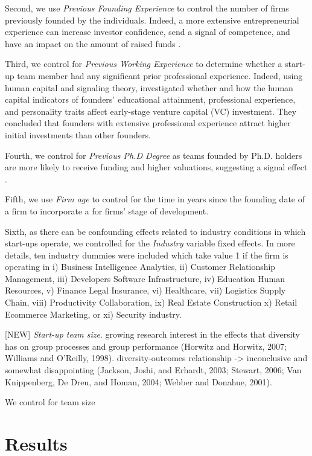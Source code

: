 \documentclass[12pt]{article}
\begin{document}
Second, we use \textit{Previous Founding Experience} to control the number of firms previously founded by the individuals. Indeed, a more extensive entrepreneurial experience can increase investor confidence, send a signal of competence, and have an impact on the amount of raised funds \citep{hsu2007experienced}.

Third, we control for \textit{Previous Working Experience} to determine whether a start-up team member had any significant prior professional experience. Indeed, using human capital and signaling theory, \citet{subramanian2022backing} investigated whether and how the human capital indicators of founders' educational attainment, professional experience, and personality traits affect early-stage venture capital (VC) investment. They concluded that founders with extensive professional experience attract higher initial investments than other founders.

Fourth, we control for \textit{Previous Ph.D Degree} as teams founded by Ph.D. holders are more likely to receive funding and higher valuations, suggesting a signal effect \citep{hsu2007experienced}.

Fifth, we use \textit{Firm age} to control for the time in years since the founding date of a firm to incorporate a for firms’ stage of development.

Sixth, as there can be confounding effects related to industry conditions in which start-ups operate, we controlled for the \textit{Industry} variable fixed effects. In more details, ten industry dummies were included which take value 1 if the firm is operating in i) Business Intelligence Analytics, ii) Customer Relationship Management, iii) Developers Software Infrastructure, iv) Education Human Resources, v) Finance Legal Insurance, vi) Healthcare, vii) Logistics Supply Chain, viii) Productivity Collaboration, ix) Real Estate Construction x) Retail Ecommerce Marketing, or xi) Security industry.

[NEW] \textit{Start-up team size}. growing research interest in the effects that diversity has on group processes and group performance (Horwitz and Horwitz, 2007; Williams and O’Reilly, 1998).  diversity-outcomes relationship -> inconclusive and somewhat disappointing (Jackson, Joshi, and Erhardt, 2003; Stewart, 2006; Van Knippenberg, De Dreu, and Homan, 2004; Webber and Donahue, 2001).

We control for team size

\section{Results}
\end{document}
